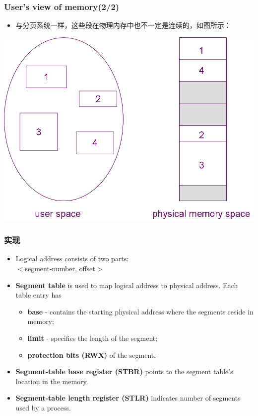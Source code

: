 \documentclass[CJKutf8,xcolor=pdftex,dvipsnames,table]{beamer}
\begin{document}
\begin{CJK*}{UTF8}{song}
  \begin{frame}
  \frametitle{User's view of memory(2/2)} \pause
  \begin{itemize}
  \item{与分页系统一样，这些段在物理内存中也不一定是连续的，如图所示：} \pause
  \end{itemize}
  \begin{center}
    \includegraphics[scale=.5]{logicalviewofmemory}
  \end{center}
  \end{frame}
  
  \begin{frame}
  \frametitle{实现} \pause
  \begin{itemize}
  \item{Logical address consists of two parts: \\ $<$segment-number, offset$>$ } \pause
  \item{\textbf{Segment table} is used to map logical address to physical address. Each table entry has} \pause
    \begin{itemize}
    \item{\textbf{base} - contains the starting physical address where the segments reside in memory; } \pause
    \item{\textbf{limit} - specifies the length of the segment; } \pause
    \item{\textbf{protection bits (RWX)} of the segment. } \pause
    \end{itemize}
  \item{\textbf{Segment-table base register (STBR)} points to the segment table's location in the memory.} \pause
  \item{\textbf{Segment-table length register (STLR)} indicates number of segments used by a process.}
  \end{itemize}
  \end{frame}
  

\end{CJK*}
\end{document}
